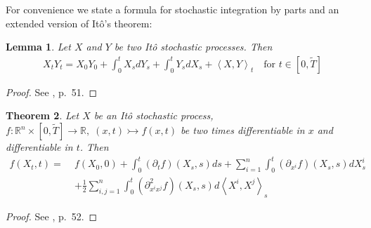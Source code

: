 \documentclass[12pt]{article}
\newtheorem{theorem}{Theorem}[section]
\newtheorem{lemma}[theorem]{Lemma}
\begin{document}
	For convenience we state a formula for stochastic integration by parts and an extended version of Itô's theorem:
	\begin{lemma}
		Let $X$ and $Y$ be two Itô stochastic processes. Then
		\begin{align*}
			X_t Y_t = X_0 Y_0 + \int_{0}^{t}X_sdY_s + \int_{0}^{t}Y_sdX_s + \left\langle X, Y\right\rangle_t \quad \text{for }t \in \left[0,\tilde{T}\right]
		\end{align*}
	\end{lemma}
	\begin{proof}
		See \cite{fima2Lecture}, p.\ 51. %
	\end{proof}
	\begin{theorem}
		Let $X$ be an Itô stochastic process, $f: \mathbb{R}^n \times [0,\tilde{T}] \rightarrow \mathbb{R}, \; (x,t) \rightarrowtail f(x, t)$ be two times differentiable in $x$ and differentiable in $t$. Then
		\begin{align*}
			f(X_t, t) = \;&f(X_0, 0) + \int_{0}^{t}(\partial_{t}f)(X_s, s)ds + \sum_{i=1}^{n}\int_{0}^{t}(\partial_{x^i}f)(X_s, s)dX^i_s \\
			&+ \frac{1}{2} \sum_{i,j=1}^{n}\int_{0}^{t}(\partial^2_{x^ix^j}f)(X_s, s)d\left\langle X^i, X^j\right\rangle_s
		\end{align*}
		
	\end{theorem}
	\begin{proof}
		See \cite{fima2Lecture}, p.\ 52. %
	\end{proof}
	
\end{document}
